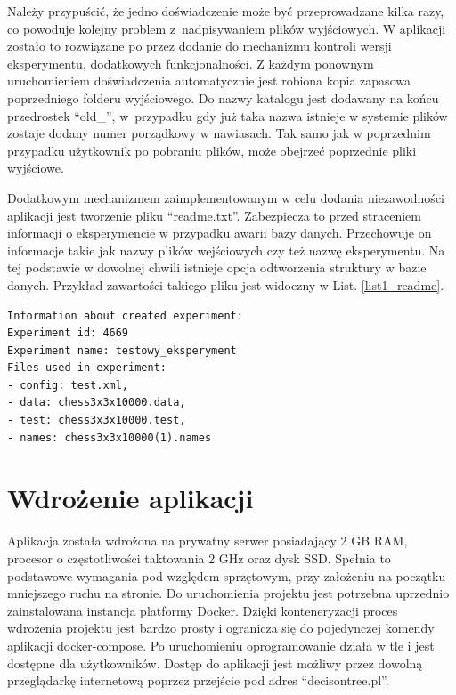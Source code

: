 Należy przypuścić, że jedno doświadczenie może być przeprowadzane kilka razy, co powoduje kolejny problem z~nadpisywaniem plików wyjściowych. W aplikacji zostało to rozwiązane po przez dodanie do mechanizmu kontroli wersji eksperymentu, dodatkowych funkcjonalności. Z każdym ponownym uruchomieniem doświadczenia automatycznie jest robiona kopia zapasowa poprzedniego folderu wyjściowego. Do nazwy katalogu jest dodawany na końcu przedrostek \enquote{old\_}, w~przypadku gdy już taka nazwa istnieje w systemie plików zostaje dodany numer porządkowy w nawiasach. Tak samo jak w poprzednim przypadku użytkownik po pobraniu plików, może obejrzeć poprzednie pliki wyjściowe. 

Dodatkowym mechanizmem zaimplementowanym w celu dodania niezawodności aplikacji jest tworzenie pliku \enquote{readme.txt}. Zabezpiecza to przed straceniem informacji o eksperymencie w przypadku awarii bazy danych. Przechowuje on informacje takie jak nazwy plików wejściowych czy też nazwę eksperymentu. Na tej podstawie w dowolnej chwili istnieje opcja odtworzenia struktury w bazie danych. Przykład zawartości takiego pliku jest widoczny w List. \ref{list1_readme}.

\begin{lstlisting}[numbers=none,frame=single, caption={Przykład zawartości pliku readme },captionpos=b, label=list1_readme]
Information about created experiment: 
Experiment id: 4669
Experiment name: testowy_eksperyment
Files used in experiment: 
- config: test.xml,
- data: chess3x3x10000.data, 
- test: chess3x3x10000.test, 
- names: chess3x3x10000(1).names
\end{lstlisting}


\section{Wdrożenie aplikacji}
Aplikacja została wdrożona na prywatny serwer posiadający 2 GB RAM, procesor o częstotliwości taktowania 2 GHz oraz dysk SSD. Spełnia to podstawowe wymagania pod względem sprzętowym, przy założeniu na początku mniejszego ruchu na stronie. Do uruchomienia projektu jest potrzebna uprzednio zainstalowana instancja platformy Docker. Dzięki konteneryzacji proces wdrożenia projektu jest bardzo prosty i ogranicza się do pojedynczej komendy aplikacji docker-compose. Po uruchomieniu oprogramowanie działa w tle i jest dostępne dla użytkowników. Dostęp do aplikacji jest możliwy przez dowolną przeglądarkę internetową poprzez przejście pod adres \enquote{decisontree.pl}. 
